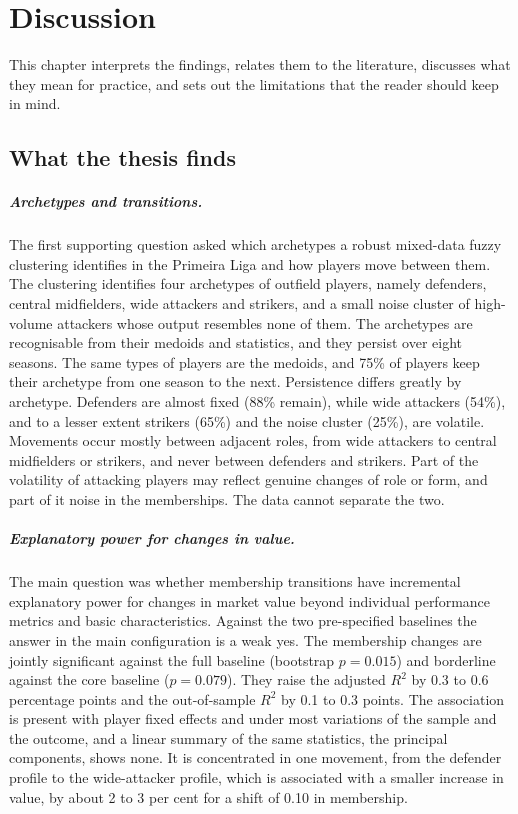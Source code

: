 \chapter{Discussion}
\label{ch:discussion}

This chapter interprets the findings, relates them to the literature, discusses what they mean for practice, and sets out the limitations that the reader should keep in mind.

\section{What the thesis finds}
\label{sec:disc-findings}

\paragraph{Archetypes and transitions.} The first supporting question asked which archetypes a robust mixed-data fuzzy clustering identifies in the Primeira Liga and how players move between them. The clustering identifies four archetypes of outfield players, namely defenders, central midfielders, wide attackers and strikers, and a small noise cluster of high-volume attackers whose output resembles none of them. The archetypes are recognisable from their medoids and statistics, and they persist over eight seasons. The same types of players are the medoids, and 75\% of players keep their archetype from one season to the next. Persistence differs greatly by archetype. Defenders are almost fixed (88\% remain), while wide attackers (54\%), and to a lesser extent strikers (65\%) and the noise cluster (25\%), are volatile. Movements occur mostly between adjacent roles, from wide attackers to central midfielders or strikers, and never between defenders and strikers. Part of the volatility of attacking players may reflect genuine changes of role or form, and part of it noise in the memberships. The data cannot separate the two.

\paragraph{Explanatory power for changes in value.} The main question was whether membership transitions have incremental explanatory power for changes in market value beyond individual performance metrics and basic characteristics. Against the two pre-specified baselines the answer in the main configuration is a weak yes. The membership changes are jointly significant against the full baseline (bootstrap $p=0.015$) and borderline against the core baseline ($p=0.079$). They raise the adjusted $R^2$ by 0.3 to 0.6 percentage points and the out-of-sample $R^2$ by 0.1 to 0.3 points. The association is present with player fixed effects and under most variations of the sample and the outcome, and a linear summary of the same statistics, the principal components, shows none. It is concentrated in one movement, from the defender profile to the wide-attacker profile, which is associated with a smaller increase in value, by about 2 to 3 per cent for a shift of 0.10 in membership.

